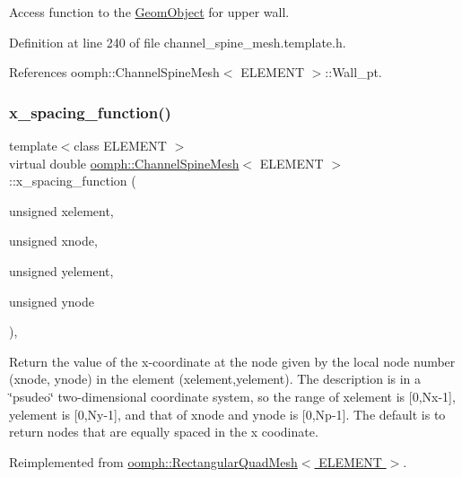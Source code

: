 Access function to the \hyperlink{classoomph_1_1GeomObject}{Geom\+Object} for upper wall. 



Definition at line 240 of file channel\+\_\+spine\+\_\+mesh.\+template.\+h.



References oomph\+::\+Channel\+Spine\+Mesh$<$ E\+L\+E\+M\+E\+N\+T $>$\+::\+Wall\+\_\+pt.

\mbox{\label{classoomph_1_1ChannelSpineMesh_a16e0d4264443b1beb274753b0d6b970e}} 
\subsubsection{\texorpdfstring{x\+\_\+spacing\+\_\+function()}{x\_spacing\_function()}}
{\footnotesize\ttfamily template$<$class E\+L\+E\+M\+E\+NT $>$ \\
virtual double \hyperlink{classoomph_1_1ChannelSpineMesh}{oomph\+::\+Channel\+Spine\+Mesh}$<$ E\+L\+E\+M\+E\+NT $>$\+::x\+\_\+spacing\+\_\+function (\begin{DoxyParamCaption}\item[{unsigned}]{xelement,  }\item[{unsigned}]{xnode,  }\item[{unsigned}]{yelement,  }\item[{unsigned}]{ynode }\end{DoxyParamCaption})\hspace{0.3cm}{\ttfamily [inline]}, {\ttfamily [virtual]}}



Return the value of the x-\/coordinate at the node given by the local node number (xnode, ynode) in the element (xelement,yelement). The description is in a \char`\"{}psudeo\char`\"{} two-\/dimensional coordinate system, so the range of xelement is \mbox{[}0,Nx-\/1\mbox{]}, yelement is \mbox{[}0,Ny-\/1\mbox{]}, and that of xnode and ynode is \mbox{[}0,Np-\/1\mbox{]}. The default is to return nodes that are equally spaced in the x coodinate. 



Reimplemented from \hyperlink{classoomph_1_1RectangularQuadMesh_ad4c2f349cf201cb3107f0a4e5447c16f}{oomph\+::\+Rectangular\+Quad\+Mesh$<$ E\+L\+E\+M\+E\+N\+T $>$}.



